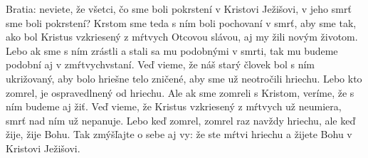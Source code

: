 Bratia: neviete, že všetci, čo sme boli pokrstení v Kristovi Ježišovi, v jeho smrť sme boli pokrstení? Krstom sme teda s ním boli pochovaní v smrť, aby sme tak, ako bol Kristus vzkriesený z mŕtvych Otcovou slávou, aj my žili novým životom. 
\versseparator
Lebo ak sme s ním zrástli a stali sa mu podobnými v smrti, tak mu budeme podobní aj v zmŕtvychvstaní. Veď vieme, že náš starý človek bol s ním ukrižovaný, aby bolo hriešne telo zničené, aby sme už neotročili hriechu.
Lebo kto zomrel, je ospravedlnený od hriechu.
\versseparator
Ale ak sme zomreli s Kristom, veríme, že s ním budeme aj žiť. Veď vieme, že Kristus vzkriesený z mŕtvych už neumiera, smrť nad ním už nepanuje. Lebo keď zomrel, zomrel raz navždy hriechu, ale keď žije, žije Bohu. Tak zmýšľajte o sebe aj vy: že ste mŕtvi hriechu a žijete Bohu v Kristovi Ježišovi.